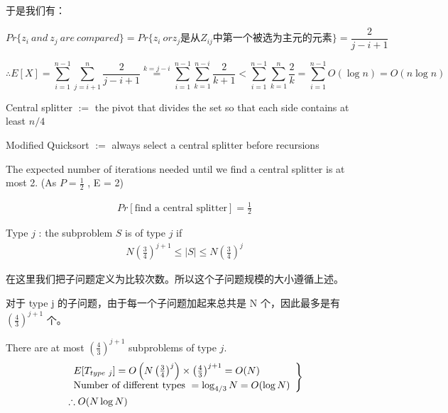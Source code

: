 \documentclass{article}
\begin{document}
于是我们有：

$$Pr\{z_i \ and \ z_j \ are \ compared\} = Pr\{z_i \ or z_j \text{是从} Z_{ij} \text{中第一个被选为主元的元素}\} = \frac{2}{j-i+1}$$

$$\therefore E[X] = \sum\limits_{i=1}^{n-1}\sum\limits_{j=i+1}^{n}\frac{2}{j-i+1} \mathop{=}\limits^{k = j - i} \sum\limits_{i=1}^{n-1}\sum\limits_{k=1}^{n-i}\frac{2}{k+1} < \sum\limits_{i=1}^{n-1}\sum\limits_{k=1}^{n}\frac{2}{k} = \sum\limits_{i=1}^{n-1}O(\log n) = O(n \log n)$$

\par\hspace*{\fill}\par
\par\hspace*{\fill}\par
\par\hspace*{\fill}\par

Central splitter $:=$ the pivot that divides the set so that each side contains at least $n/4$

Modified Quicksort $:=$ always select a central splitter before recursions

The expected number of iterations needed until we find a central splitter is at most 2. (As $P = \frac{1}{2}$ , E = 2)

\begin{align*}
    Pr[\text{find a central splitter}]=\frac{1}{2}
\end{align*}

Type $j$ : the subproblem $S$ is of type $j$ if
\begin{align*}
    N\left( \frac{3}{4} \right)^{j+1}\le |S|\le N\left( \frac{3}{4} \right)^j
\end{align*}

在这里我们把子问题定义为比较次数。所以这个子问题规模的大小遵循上述。

对于 type j 的子问题，由于每一个子问题加起来总共是 N 个，因此最多是有 $(\frac{4}{3})^{j+1}$ 个。

There are at most $\left( \frac{4}{3} \right)^{j+1}$ subproblems of type $j$.
\begin{align*}
    &\left.\begin{array}[c]{l}
        E[T_{type\ j}]=O\left( N\left( \frac{3}{4} \right)^j \right)\times \left( \frac{4}{3} \right)^{j+1}=O(N)\\
        \text{Number of different types }=\log_{4/3}N=O(\log N)
    \end{array}\right\}\\
    &\therefore O(N\log N)
\end{align*}
\end{document}
